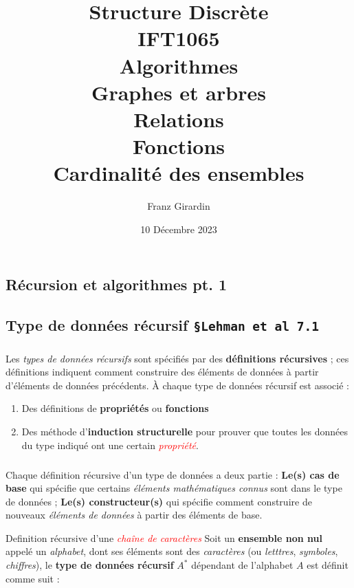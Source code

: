 \documentclass[16pt]{report}
\title{\Huge{Structure Discrète}\\{IFT1065}\\{\textbf{Algorithmes}}\\{\textbf{Graphes et arbres}}\\ 
{\textbf{Relations}}\\{\textbf{Fonctions}}\\{\textbf{Cardinalité des ensembles}}}
\author{\huge{Franz Girardin}}
\date{10 Décembre 2023}
\begin{document}
\maketitle
\pagebreak
\tableofcontents 
\pagebreak

\pagebreak
\begin{multicols*}{2}
    \newcommand{\sectionsymbol}{\textrm{\textnormal{${}^\S$}}}
    \chapter{Récursion et algorithmes pt. 1}
            
    \section{Type de données récursif \texttt{\small{\S Lehman et al 7.1}}}
            \paragraph{} 
            Les \textit{types de données récursifs} sont spécifiés par des \textbf{définitions récursives} ; 
            ces définitions indiquent comment construire des éléments de données à partir d'éléments de données 
            précédents. À chaque type de données récursif est associé :
            \begin{enumerate}
                \item Des définitions de \textbf{propriétés} ou \textbf{fonctions} 
                \item Des méthode d'\textbf{induction structurelle} pour prouver que toutes les données du type 
                    indiqué ont une certain \textit{\textcolor{red}{propriété}}. 
            \end{enumerate}

            \paragraph{} 
            Chaque définition récursive d'un type de données a deux partie : \textbf{Le(s) cas de base} qui spécifie 
            que certains \textit{éléments mathématiques connus} sont dans le type de données ; 
            \textbf{Le(s) constructeur(s)} qui spécifie comment construire de nouveaux 
            \textit{éléments de données} à partir des éléments de base.     

            \begin{Definitionx}{Definition récursive d'une \textit{\textcolor{red}{chaîne de caractères}}}{}
                    Soit un \textbf{ensemble non nul} appelé un \textit{alphabet}, dont ses éléments        
                    sont des \textit{caractères} (ou \textit{letttres}, \textit{symboles}, \textit{chiffres}), 
                    le \textbf{type de données récursif} $A^*$ dépendant de l'alphabet $A$ est définit comme suit : 


\end{Definitionx}
\end{multicols*}
\end{document}
